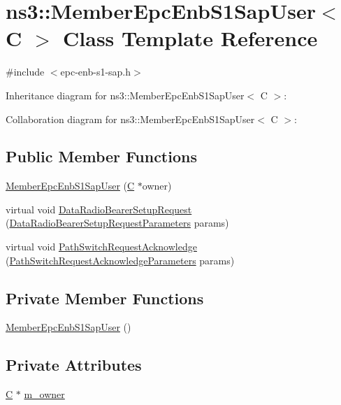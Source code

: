 \hypertarget{classns3_1_1MemberEpcEnbS1SapUser}{}\section{ns3\+:\+:Member\+Epc\+Enb\+S1\+Sap\+User$<$ C $>$ Class Template Reference}
\label{classns3_1_1MemberEpcEnbS1SapUser}


{\ttfamily \#include $<$epc-\/enb-\/s1-\/sap.\+h$>$}



Inheritance diagram for ns3\+:\+:Member\+Epc\+Enb\+S1\+Sap\+User$<$ C $>$\+:


Collaboration diagram for ns3\+:\+:Member\+Epc\+Enb\+S1\+Sap\+User$<$ C $>$\+:
\subsection*{Public Member Functions}
\begin{DoxyCompactItemize}
\item 
\hyperlink{classns3_1_1MemberEpcEnbS1SapUser_a982b0cb582387fdc7ba133dce070c472}{Member\+Epc\+Enb\+S1\+Sap\+User} (\hyperlink{loss__COST231__small__cities__urban_8m_aaa53ca0b650dfd85c4f59fa156f7a2cc}{C} $\ast$owner)
\item 
virtual void \hyperlink{classns3_1_1MemberEpcEnbS1SapUser_ae7e1243113fe7414e6056393a7b4da72}{Data\+Radio\+Bearer\+Setup\+Request} (\hyperlink{structns3_1_1EpcEnbS1SapUser_1_1DataRadioBearerSetupRequestParameters}{Data\+Radio\+Bearer\+Setup\+Request\+Parameters} params)
\item 
virtual void \hyperlink{classns3_1_1MemberEpcEnbS1SapUser_ad3b6238716c6c704e39e9104d9d18fd0}{Path\+Switch\+Request\+Acknowledge} (\hyperlink{structns3_1_1EpcEnbS1SapUser_1_1PathSwitchRequestAcknowledgeParameters}{Path\+Switch\+Request\+Acknowledge\+Parameters} params)
\end{DoxyCompactItemize}
\subsection*{Private Member Functions}
\begin{DoxyCompactItemize}
\item 
\hyperlink{classns3_1_1MemberEpcEnbS1SapUser_ae25e852e5899471d31760297ddc9b84c}{Member\+Epc\+Enb\+S1\+Sap\+User} ()
\end{DoxyCompactItemize}
\subsection*{Private Attributes}
\begin{DoxyCompactItemize}
\item 
\hyperlink{loss__COST231__small__cities__urban_8m_aaa53ca0b650dfd85c4f59fa156f7a2cc}{C} $\ast$ \hyperlink{classns3_1_1MemberEpcEnbS1SapUser_ab047ea3026f267bb48278bf4898d2b45}{m\+\_\+owner}
\end{DoxyCompactItemize}


